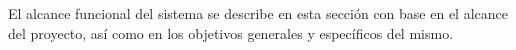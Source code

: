 %

El alcance funcional del sistema se describe en esta sección con base en el 
alcance del proyecto, así como en los objetivos generales y específicos del 
mismo.
